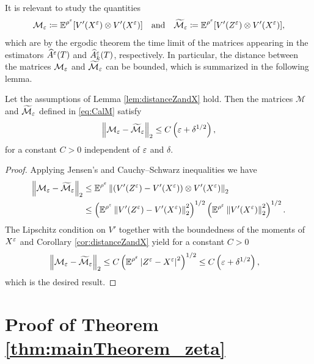 \documentclass[10pt]{article}
\begin{document}
\begin{appendices}
It is relevant to study the quantities
\begin{equation}\label{eq:CalM}
\mathcal M_\varepsilon \coloneqq \operatorname{\mathbb{E}}^{\rho^\varepsilon}[V'(X^\varepsilon) \otimes V'(X^\varepsilon)] \quad \text{and} \quad \widetilde{\mathcal M}_\varepsilon \coloneqq \operatorname{\mathbb{E}}^{\rho^\varepsilon}[V'(Z^\varepsilon) \otimes V'(X^\varepsilon)],
\end{equation}
which are by the ergodic theorem the time limit of the matrices appearing in the estimators $\widehat A^\varepsilon(T)$ and $\widehat A^\varepsilon_k(T)$, respectively. In particular, the distance between the matrices $\mathcal M_\varepsilon$ and $\widetilde{\mathcal M}_\varepsilon$ can be bounded, which is summarized in the following lemma.

\begin{lemma}\label{lem:distanceMandTildeM} Let the assumptions of Lemma \ref{lem:distanceZandX} hold. Then the matrices $\mathcal M$ and $\widetilde{\mathcal M}_\varepsilon$ defined in \eqref{eq:CalM} satisfy
	\begin{equation}
	\left\|\mathcal M_\varepsilon - \widetilde{\mathcal M}_\varepsilon\right\|_2 \leq C\left(\varepsilon + \delta^{1/2}\right),
	\end{equation}
	for a constant $C > 0$ independent of $\varepsilon$ and $\delta$.
\end{lemma}
\begin{proof} Applying Jensen's and Cauchy--Schwarz inequalities we have
	\begin{equation}
	\begin{aligned}
	\left\|\mathcal M_\varepsilon - \widetilde{\mathcal M}_\varepsilon\right\|_2 &\leq \operatorname{\mathbb{E}}^{\rho^\varepsilon} \left\|\left(V'(Z^\varepsilon) - V'(X^\varepsilon)\right) \otimes V'(X^\varepsilon)\right\|_2 \\
	&\leq \left(\operatorname{\mathbb{E}}^{\rho^\varepsilon}\left\|V'(Z^\varepsilon) - V'(X^\varepsilon)\right\|_2^2\right)^{1/2} \left(\operatorname{\mathbb{E}}^{\rho^\varepsilon} \left\|V'(X^\varepsilon)\right\|_2^{2}\right)^{1/2}.
	\end{aligned}
	\end{equation}
	The Lipschitz condition on $V'$ together with the boundedness of the moments of $X^\varepsilon$ and Corollary \ref{cor:distanceZandX} yield for a constant $C > 0$
	\begin{equation}
	\begin{aligned}
	\left\|\mathcal M_\varepsilon - \widetilde{\mathcal M}_\varepsilon\right\|_2 &\leq C\left(\operatorname{\mathbb{E}}^{\rho^\varepsilon}\left\lvert Z^\varepsilon - X^\varepsilon\right\rvert^{2}\right)^{1/2} \leq C \left(\varepsilon + \delta^{1/2} \right),
	\end{aligned}
	\end{equation}
	which is the desired result.
\end{proof}

\section{Proof of Theorem \ref{thm:mainTheorem_zeta}} \label{ap:zeta}


\end{appendices}
\end{document}
